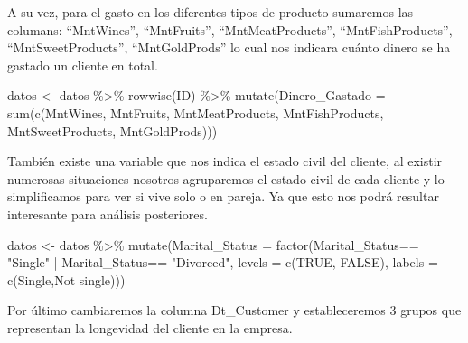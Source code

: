 \documentclass[
]{article}
\newenvironment{Shaded}{\begin{snugshade}}{\end{snugshade}}
\newcommand{\AttributeTok}[1]{\textcolor[rgb]{0.77,0.63,0.00}{#1}}
\newcommand{\ConstantTok}[1]{\textcolor[rgb]{0.00,0.00,0.00}{#1}}
\newcommand{\FunctionTok}[1]{\textcolor[rgb]{0.00,0.00,0.00}{#1}}
\newcommand{\NormalTok}[1]{#1}
\newcommand{\OtherTok}[1]{\textcolor[rgb]{0.56,0.35,0.01}{#1}}
\newcommand{\SpecialCharTok}[1]{\textcolor[rgb]{0.00,0.00,0.00}{#1}}
\newcommand{\StringTok}[1]{\textcolor[rgb]{0.31,0.60,0.02}{#1}}
\begin{document}
A su vez, para el gasto en los diferentes tipos de producto sumaremos
las columans: ``MntWines'', ``MntFruits'', ``MntMeatProducts'',
``MntFishProducts'', ``MntSweetProducts'', ``MntGoldProds'' lo cual nos
indicara cuánto dinero se ha gastado un cliente en total.

\begin{Shaded}
\begin{Highlighting}[]
\NormalTok{datos }\OtherTok{\textless{}{-}}\NormalTok{ datos }\SpecialCharTok{\%\textgreater{}\%}
  \FunctionTok{rowwise}\NormalTok{(ID) }\SpecialCharTok{\%\textgreater{}\%}
  \FunctionTok{mutate}\NormalTok{(}\AttributeTok{Dinero\_Gastado =} \FunctionTok{sum}\NormalTok{(}\FunctionTok{c}\NormalTok{(MntWines, MntFruits, MntMeatProducts, MntFishProducts, }
\NormalTok{                                MntSweetProducts, MntGoldProds)))}
\end{Highlighting}
\end{Shaded}

También existe una variable que nos indica el estado civil del cliente,
al existir numerosas situaciones nosotros agruparemos el estado civil de
cada cliente y lo simplificamos para ver si vive solo o en pareja. Ya
que esto nos podrá resultar interesante para análisis posteriores.

\begin{Shaded}
\begin{Highlighting}[]
\NormalTok{datos }\OtherTok{\textless{}{-}}\NormalTok{ datos }\SpecialCharTok{\%\textgreater{}\%}
  \FunctionTok{mutate}\NormalTok{(}\AttributeTok{Marital\_Status =} \FunctionTok{factor}\NormalTok{(Marital\_Status}\SpecialCharTok{==} \StringTok{"Single"} \SpecialCharTok{|}\NormalTok{ Marital\_Status}\SpecialCharTok{==} \StringTok{"Divorced"}\NormalTok{, }
                          \AttributeTok{levels =} \FunctionTok{c}\NormalTok{(}\ConstantTok{TRUE}\NormalTok{, }\ConstantTok{FALSE}\NormalTok{), }\AttributeTok{labels =} \FunctionTok{c}\NormalTok{(}\StringTok{\textquotesingle{}Single\textquotesingle{}}\NormalTok{,}\StringTok{\textquotesingle{}Not single\textquotesingle{}}\NormalTok{)))}
\end{Highlighting}
\end{Shaded}

Por último cambiaremos la columna Dt\_Customer y estableceremos 3 grupos
que representan la longevidad del cliente en la empresa.
\end{document}

